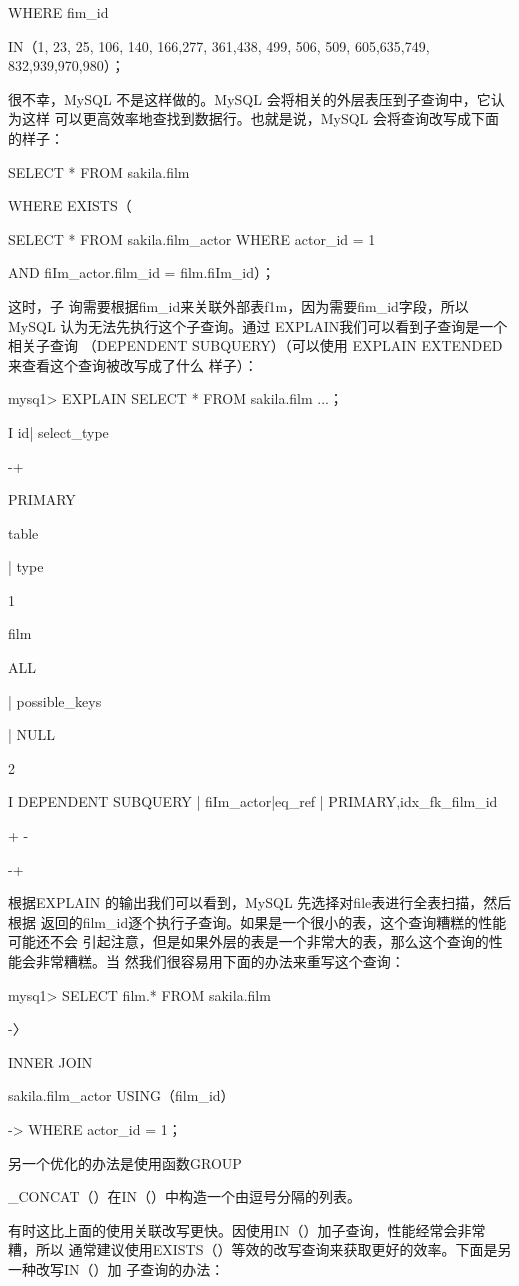 WHERE fim\_id

IN（1, 23, 25, 106, 140, 166,277, 361,438, 499, 506, 509, 605,635,749, 832,939,970,980）；

很不幸，MySQL 不是这样做的。MySQL 会将相关的外层表压到子查询中，它认为这样
可以更高效率地查找到数据行。也就是说，MySQL 会将查询改写成下面的样子：

SELECT * FROM sakila.film

WHERE EXISTS（

SELECT * FROM sakila.film\_actor WHERE actor\_id = 1

AND fiIm\_actor.film\_id = film.fiIm\_id）；

这时，子 询需要根据fim\_id来关联外部表f1m，因为需要fim\_id字段，所以 MySQL
认为无法先执行这个子查询。通过 EXPLAIN我们可以看到子查询是一个相关子查询
（DEPENDENT SUBQUERY）（可以使用 EXPLAIN EXTENDED 来查看这个查询被改写成了什么
样子）：

mysq1> EXPLAIN SELECT * FROM sakila.film ...；

I id| select\_type

-+

PRIMARY

table

| type

1

film

ALL

| possible\_keys

| NULL

2

I DEPENDENT SUBQUERY | fiIm\_actor|eq\_ref | PRIMARY,idx\_fk\_film\_id

+ -

-+

根据EXPLAIN 的输出我们可以看到，MySQL 先选择对file表进行全表扫描，然后根据
返回的film\_id逐个执行子查询。如果是一个很小的表，这个查询糟糕的性能可能还不会
引起注意，但是如果外层的表是一个非常大的表，那么这个查询的性能会非常糟糕。当
然我们很容易用下面的办法来重写这个查询：

mysq1> SELECT film.* FROM sakila.film

-〉

INNER JOIN

sakila.film\_actor USING（film\_id）

-> WHERE actor\_id = 1；

另一个优化的办法是使用函数GROUP

\_CONCAT（）在IN（）中构造一个由逗号分隔的列表。

有时这比上面的使用关联改写更快。因使用IN（）加子查询，性能经常会非常糟，所以
通常建议使用EXISTS（）等效的改写查询来获取更好的效率。下面是另一种改写IN（）加
子查询的办法：

